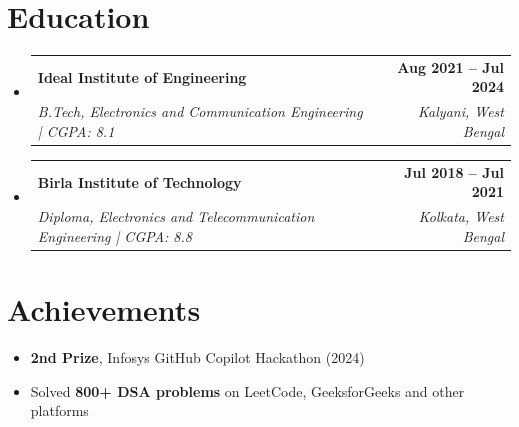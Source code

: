 \documentclass[a4paper,11pt]{article}
\makeatletter
\newcommand{\resumeItem}[1]{
  \item\small{{#1 \vspace{-2pt}}}
}
\newcommand{\resumeSubheading}[4]{
  \vspace{-2pt}\item
  \begin{tabular*}{1.0\textwidth}[t]{l@{\extracolsep{\fill}}r}
    \textbf{#1} & \textbf{\small #2} \\
    \textit{\small#3} & \textit{\small #4} \\
  \end{tabular*}\vspace{-7pt}
}
\newcommand{\resumeSubHeadingListStart}{\begin{itemize}[leftmargin=0.0in, label={}]}
\newcommand{\resumeSubHeadingListEnd}{\end{itemize}}
\newcommand{\resumeItemListStart}{\begin{itemize}[leftmargin=0.15in, itemsep=0pt, topsep=2pt]}
\newcommand{\resumeItemListEnd}{\end{itemize}\vspace{-6pt}}
\makeatother
\begin{document}
\section{Education}
\resumeSubHeadingListStart

\resumeSubheading
{Ideal Institute of Engineering}{Aug 2021 -- Jul 2024}
{B.Tech, Electronics and Communication Engineering | CGPA: 8.1}{Kalyani, West Bengal}

\resumeSubheading
{Birla Institute of Technology}{Jul 2018 -- Jul 2021}
{Diploma, Electronics and Telecommunication Engineering | CGPA: 8.8}{Kolkata, West Bengal}

\resumeSubHeadingListEnd
\vspace{-5pt}

\section{Achievements}
\resumeSubHeadingListStart
\resumeItemListStart
\resumeItem{\textbf{2nd Prize}, Infosys GitHub Copilot Hackathon (2024)}
\resumeItem{Solved \textbf{800+ DSA problems} on LeetCode, GeeksforGeeks and other platforms}
\resumeItemListEnd
\resumeSubHeadingListEnd
\end{document}
